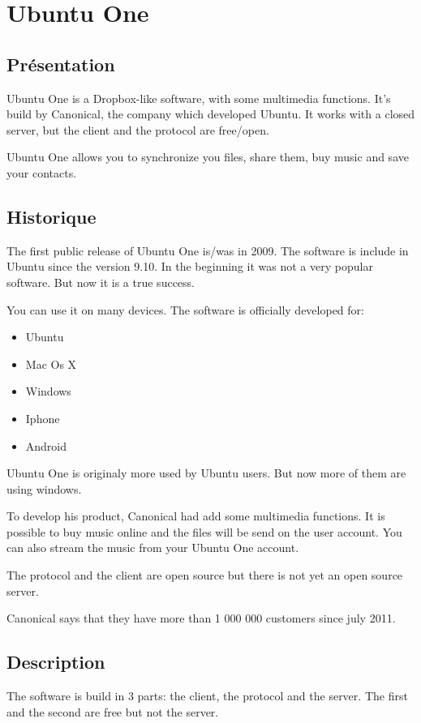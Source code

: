 \section{Ubuntu One}
\thispagestyle{EIP} %
\subsection{Présentation}
Ubuntu One is a Dropbox-like software, with some multimedia functions. It's build by Canonical, the company which developed Ubuntu. It works with a closed server, but the client and the protocol are free/open.

Ubuntu One allows you to synchronize you files, share them, buy music and save your contacts.

\subsection{Historique}
The first public release of Ubuntu One is/was in 2009. The software is include in Ubuntu since the version 9.10. In the beginning it was not a very popular software. But now it is a true success.

You can use it on many devices. The software is officially developed for: 
\begin{itemize}
\renewcommand{\labelitemi}{$\bullet$}
\item Ubuntu
\item Mac Os X
\item Windows
\item Iphone
\item Android
\end{itemize}

Ubuntu One is originaly more used by Ubuntu users. But now more of them are using windows.

To develop his product, Canonical had add some multimedia functions. It is possible to buy music online and the files will be send on the user account. You can also stream the music from your Ubuntu One account.

The protocol and the client are open source but there is not yet an open source server.

Canonical says that they have more than 1 000 000 customers since july 2011.

\subsection{Description}
The software is build in 3 parts: the client, the protocol and the server. The first and the second are free but not the server.

